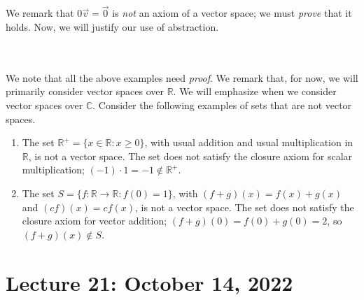        \vphantom
        \\
        \\
        We remark that \(0\vec{v}=\vec{0}\) is \textit{not} an axiom of a vector space; we must \textit{prove} that it holds. Now, we will justify our use of abstraction.
        \vphantom
        \\
        \\
        We note that all the above examples need \textit{proof}. We remark that, for now, we will primarily consider vector spaces over \(\mathbb{R}\). We will emphasize when we consider vector spaces over \(\mathbb{C}\).  Consider the following examples of sets that are not vector spaces.
        \begin{enumerate}
            \item The set \(\mathbb{R}^+=\{x\in\mathbb{R}:x\geq0\}\), with usual addition and usual multiplication in \(\mathbb{R}\), is not a vector space. The set does not satisfy the closure axiom for scalar multiplication; \((-1)\cdot1=-1\nin\mathbb{R}^+\).
            \item The set \(S=\{f:\mathbb{R}\to\mathbb{R}:f(0)=1\}\), with \((f+g)(x)=f(x)+g(x)\) and \((cf)(x)=cf(x)\), is not a vector space. The set does not satisfy the closure axiom for vector addition; \((f+g)(0)=f(0)+g(0)=2\), so \((f+g)(x)\nin S\).
        \end{enumerate}

\pagebreak

\section{Lecture 21: October 14, 2022}

